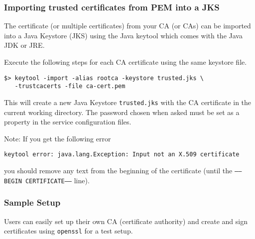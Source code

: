\documentclass[a4paper,10pt]{book}
\begin{document}
\subsubsection{Importing trusted certificates from PEM into a JKS}

The certificate (or multiple certificates) from your CA (or CAs) can be imported into a Java Keystore (JKS)  using the Java keytool which comes with the Java JDK or JRE.

Execute the following steps for each CA certificate using the same keystore file.


\begin{verbatim}
$> keytool -import -alias rootca -keystore trusted.jks \
   -trustcacerts -file ca-cert.pem
\end{verbatim}


This will create a new Java Keystore \texttt{trusted.jks} with the CA certificate in the current working directory. The password chosen when asked must be set as a property in the service configuration files.

Note: If you get the following error
\begin{verbatim}
keytool error: java.lang.Exception: Input not an X.509 certificate
\end{verbatim}
you should remove any text from the beginning of the certificate (until the \texttt{-----BEGIN CERTIFICATE-----} line).


\subsubsection{Sample Setup}

Users can easily set up their own CA (certificate authority) and create and sign certificates using \texttt{openssl} for a test setup.
\end{document}
